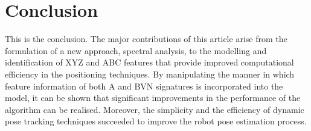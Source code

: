 \section{Conclusion}
\label{Sec:Con}
This is the conclusion. The major contributions of this article arise from the formulation of a new approach, spectral analysis, to the modelling and identification of XYZ and ABC features that provide improved computational efficiency in the positioning techniques. By manipulating the manner in which feature information of both A and BVN signatures is incorporated into the model, it can be shown that significant improvements in the performance of the algorithm can be realised. Moreover, the simplicity and the efficiency of dynamic pose tracking techniques succeeded to improve the robot pose estimation process.


